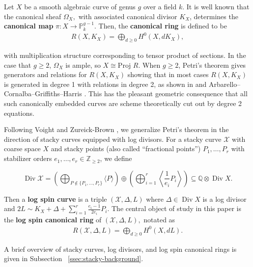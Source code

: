 \documentclass{amsart}
\theoremstyle{plain}
\theoremstyle{definition}
\theoremstyle{remark}
\numberwithin{equation}{section}
\newcommand\BQ{{\mathbb Q}}
\newcommand\BP{{\mathbb P}}
\newcommand\BZ{{\mathbb Z}}
\newcommand\proj{\text{Proj }}
\DeclareMathOperator\di{Div}
\newcommand\sx{\mathscr X}
\newcommand \subhalf[1]{\frac{{#1} - 1}{2{#1}}}
\newcommand{\halfcan}{L}
\begin{document}
Let $X$ be a smooth algebraic curve of genus $g$ over a field $k$.
It is well known that the canonical sheaf $\Omega _X,$ with
associated canonical divisor $K_X$, determines the {\bf canonical
map } $\pi: X \rightarrow \BP_k^{g - 1}$. Then, the {\bf canonical
ring} is defined to be
\begin{align*}
	R(X, K_X) = \bigoplus_{d \geq 0} H^0(X, dK_X),
\end{align*}

\noindent
with multiplication structure corresponding to tensor product of
sections. In the case that $g \geq 2$, $\Omega_X$ is ample, so $X
\cong \proj R$. When $g \geq 2$, Petri's theorem gives generators
and relations for $R(X, K_X)$ showing that in most cases $R(X, K_X)$
is generated in degree 1 with relations in degree 2, as shown in
\cite[p. 157]{saint-donat:proj} and Arbarello--Cornalba--Griffiths--Harris
\cite[Section 3.3]{acgh:algebraic-curves}. This has the pleasant 
geometric consequence that all such canonically embedded curves are
scheme theoretically cut out by degree 2 equations.

Following Voight and Zureick-Brown \cite{vzb:stacky}, we generalize 
Petri's theorem in the direction of stacky curves equipped with
log divisors. For a stacky curve $\sx$ with coarse space $X$ and
stacky points (also called ``fractional points'') $P_1, \ldots, P_r$
with stabilizer orders $e_1, \ldots, e_r \in \BZ_{\geq 2}$, we define

\[
	\di \sx = \left(\bigoplus_{P\notin \{P_1, \ldots, P_r\}} \langle 
	P \rangle \right) \oplus \left(\bigoplus_{i = 1}^r \left \langle 
	\frac{1}{e_i}P_i \right \rangle \right) \subseteq \BQ \otimes \di X.
\]

Then a {\bf log spin curve} is a triple $(\sx, \Delta, \halfcan)$
where $\Delta \in \di X$ is a log divisor and $2\halfcan \sim K_X +
\Delta + \sum_{i = 1}^{r} \subhalf{e_i} P_i$. The central object of
study in this paper is the {\bf log spin canonical ring} of $(\sx,
\Delta, \halfcan),$ notated as
\begin{align*}
	R(\sx, \Delta, \halfcan) = \bigoplus_{d \geq 0} H^0(X, d \halfcan).
\end{align*}

\noindent
A brief overview of stacky curves, log divisors, and log spin
canonical rings is given in Subsection
~\ref{ssec:stacky-background}.

\end{document}
